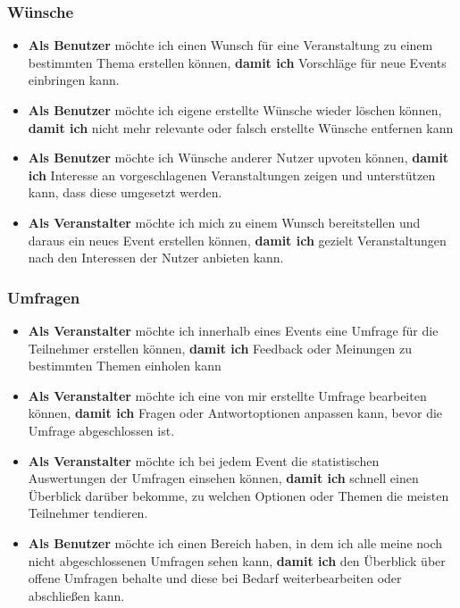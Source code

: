 \documentclass[a4paper,12pt]{article}
\begin{document}
\subsubsection{Wünsche}
\begin{itemize}
  \item \textbf{Als Benutzer} möchte ich einen Wunsch für eine Veranstaltung zu einem bestimmten Thema erstellen können, \textbf{damit ich} Vorschläge für neue Events einbringen kann.
  \item \textbf{Als Benutzer} möchte ich eigene erstellte Wünsche wieder löschen können, \textbf{damit ich} nicht mehr relevante oder falsch erstellte Wünsche entfernen kann
  \item \textbf{Als Benutzer} möchte ich Wünsche anderer Nutzer upvoten können, \textbf{damit ich} Interesse an vorgeschlagenen Veranstaltungen zeigen und unterstützen kann, dass diese umgesetzt werden.
  \item \textbf{Als Veranstalter} möchte ich mich zu einem Wunsch bereitstellen und daraus ein neues Event erstellen können, \textbf{damit ich} gezielt Veranstaltungen nach den Interessen der Nutzer anbieten kann.
\end{itemize}


\subsubsection{Umfragen}
\begin{itemize}
  \item \textbf{Als Veranstalter} möchte ich innerhalb eines Events eine Umfrage für die Teilnehmer erstellen können, \textbf{damit ich} Feedback oder Meinungen zu bestimmten Themen einholen kann
  \item \textbf{Als Veranstalter} möchte ich eine von mir erstellte Umfrage bearbeiten können, \textbf{damit ich} Fragen oder Antwortoptionen anpassen kann, bevor die Umfrage abgeschlossen ist.
  \item \textbf{Als Veranstalter} möchte ich bei jedem Event die statistischen Auswertungen der Umfragen einsehen können, \textbf{damit ich} schnell einen Überblick darüber bekomme, zu welchen Optionen oder Themen die meisten Teilnehmer tendieren.
  \item \textbf{Als Benutzer} möchte ich einen Bereich haben, in dem ich alle meine noch nicht abgeschlossenen Umfragen sehen kann, \textbf{damit ich} den Überblick über offene Umfragen behalte und diese bei Bedarf weiterbearbeiten oder abschließen kann.
\end{itemize}
\end{document}
